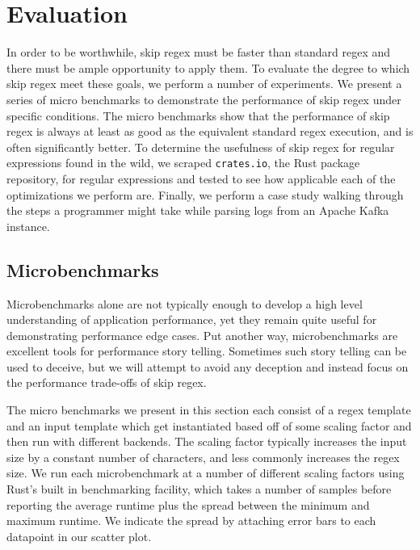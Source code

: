 \chapter{Evaluation}
\label{chapter:evaluation}

In order to be worthwhile, skip regex must be faster than standard
regex and there must be ample opportunity to apply them. To evaluate
the degree to which skip regex meet these goals, we perform a number
of experiments.  We present a series of micro benchmarks to demonstrate
the performance of skip regex under specific conditions. The micro
benchmarks show that the performance of skip regex is always
at least as good as the equivalent standard regex execution, and 
is often significantly better. To determine the usefulness of skip
regex for regular expressions found in the wild, we scraped
\verb'crates.io', the Rust package repository,
for regular expressions and tested to see how applicable each of the 
optimizations we perform are. Finally, we perform a case study walking
through the steps a programmer might take while parsing logs from
an Apache Kafka instance.

\section{Microbenchmarks}

Microbenchmarks alone are not typically enough to develop a high
level understanding of application performance, yet they remain
quite useful for demonstrating performance edge cases. Put another
way, microbenchmarks are excellent tools for performance story
telling. Sometimes such story telling can be used to deceive,
but we will attempt to avoid any deception and instead focus
on the performance trade-offs of skip regex.

The micro benchmarks we present in this section each consist of
a regex template and an input template which get instantiated
based off of some scaling factor and then run with different
backends. The scaling factor typically increases the input
size by a constant number of characters, and less commonly
increases the regex size. We run each microbenchmark at a
number of different scaling factors using Rust's built in
benchmarking facility, which takes a number of samples before
reporting the average runtime plus the spread between the minimum
and maximum runtime. We indicate the spread by attaching error bars to
each datapoint in our scatter plot.

